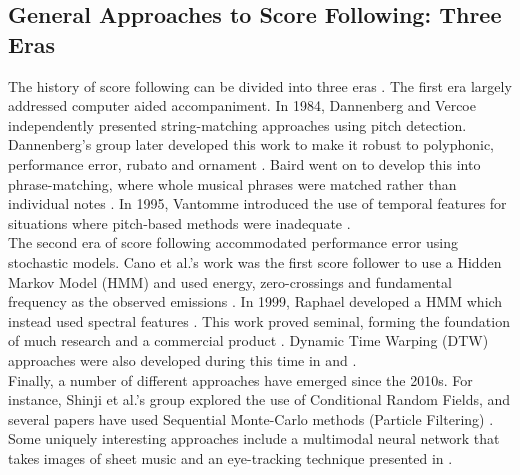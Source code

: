 \subsection{General Approaches to Score Following: Three Eras}

The history of score following can be divided into three eras \cite{lee_2022_final}. The first era largely addressed computer aided accompaniment. In 1984, Dannenberg \cite{dannenberg_1984_algorithm} and Vercoe \cite{vercoe_1984_the} independently presented string-matching approaches using pitch detection. Dannenberg’s group later developed this work to make it robust to \gls{polyphonic}, performance error, \gls{rubato} and \gls{ornament} \cite{dannenberg_1988_new}\cite{bloch_1985_realtime}. Baird went on to develop this into phrase-matching, where whole musical phrases were matched rather than individual notes \cite{baird_1990_the}\cite{baird_1993_artificial}. In 1995, Vantomme introduced the use of temporal features for situations where pitch-based methods were inadequate \cite{vantomme_1995_score}. \\

The second era of score following accommodated performance error using stochastic models. Cano et al.’s work was the first score follower to use a Hidden Markov Model (HMM) and used energy, zero-crossings and fundamental frequency as the observed emissions \cite{cano_1999_scoreperformance}. In 1999, Raphael developed a HMM which instead used spectral features \cite{raphael_1999_automatic}. This work proved seminal, forming the foundation of much research and a commercial product \cite{raphael_2006_aligning}. Dynamic Time Warping (DTW) approaches were also developed during this time in \cite{orio_2001_alignment} and \cite{dixon_2005_match}. \\

Finally, a number of different approaches have emerged since the 2010s. For instance, Shinji et al.’s group explored the use of Conditional Random Fields, and several papers have used Sequential Monte-Carlo methods (Particle Filtering) \cite{sako_2014_ryry}\cite{yamamoto_2013_robust}. Some uniquely interesting approaches include a multimodal neural network that takes images of sheet music \cite{matthiasdorfer_2016_towards} and an eye-tracking technique presented in \cite{noto_2019_adaptive}. 



